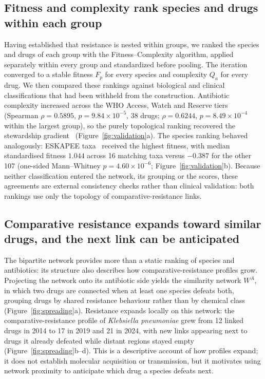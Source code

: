 \documentclass[10pt]{article}
\begin{document}
\subsection*{Fitness and complexity rank species and drugs within each group}
Having established that resistance is nested within groups, we ranked the species and drugs of each group with the Fitness--Complexity algorithm, applied separately within every group and standardized before pooling. The iteration converged to a stable fitness \(F_p\) for every species and complexity \(Q_a\) for every drug. We then compared these rankings against biological and clinical classifications that had been withheld from the construction. Antibiotic complexity increased across the WHO Access, Watch and Reserve tiers (Spearman \(\rho=0.5895\), \(p=9.84\times10^{-5}\), 38 drugs; \(\rho=0.6244\), \(p=8.49\times10^{-4}\) within the largest group), so the purely topological ranking recovered the stewardship gradient~\cite{aware} (Figure~\ref{fig:validation}a). The species ranking behaved analogously: ESKAPEE taxa~\cite{kritsotakis2022} received the highest fitness, with median standardised fitness \(1.044\) across 16 matching taxa versus \(-0.387\) for the other 107 (one-sided Mann--Whitney \(p=4.60\times10^{-6}\); Figure~\ref{fig:validation}b). Because neither classification entered the network, its grouping or the scores, these agreements are external consistency checks rather than clinical validation: both rankings use only the topology of comparative-resistance links.

\subsection*{Comparative resistance expands toward similar drugs, and the next link can be anticipated}
The bipartite network provides more than a static ranking of species and antibiotics: its structure also describes how comparative-resistance profiles grow. Projecting the network onto its antibiotic side yields the similarity network \(W^A\), in which two drugs are connected when at least one species defeats both, grouping drugs by shared resistance behaviour rather than by chemical class (Figure~\ref{fig:spreading}a). Resistance expands locally on this network: the comparative-resistance profile of \emph{Klebsiella pneumoniae} grew from 12 linked drugs in 2014 to 17 in 2019 and 21 in 2024, with new links appearing next to drugs it already defeated while distant regions stayed empty (Figure~\ref{fig:spreading}b--d). This is a descriptive account of how profiles expand; it does not establish molecular acquisition or transmission, but it motivates using network proximity to anticipate which drug a species defeats next.
\end{document}

